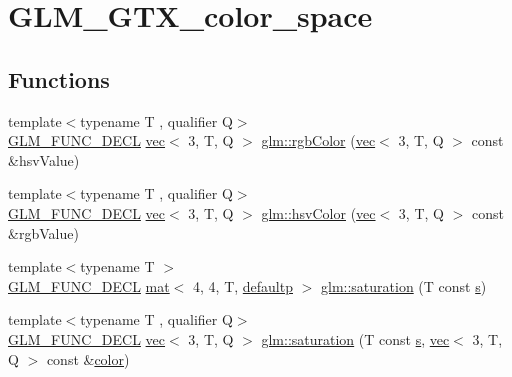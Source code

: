 \hypertarget{group__gtx__color__space}{}\section{G\+L\+M\+\_\+\+G\+T\+X\+\_\+color\+\_\+space}
\label{group__gtx__color__space}
\subsection*{Functions}
\begin{DoxyCompactItemize}
\item 
{\footnotesize template$<$typename T , qualifier Q$>$ }\\\mbox{\hyperlink{setup_8hpp_ab2d052de21a70539923e9bcbf6e83a51}{G\+L\+M\+\_\+\+F\+U\+N\+C\+\_\+\+D\+E\+CL}} \mbox{\hyperlink{structglm_1_1vec}{vec}}$<$ 3, T, Q $>$ \mbox{\hyperlink{group__gtx__color__space_ga5f9193be46f45f0655c05a0cdca006db}{glm\+::rgb\+Color}} (\mbox{\hyperlink{structglm_1_1vec}{vec}}$<$ 3, T, Q $>$ const \&hsv\+Value)
\item 
{\footnotesize template$<$typename T , qualifier Q$>$ }\\\mbox{\hyperlink{setup_8hpp_ab2d052de21a70539923e9bcbf6e83a51}{G\+L\+M\+\_\+\+F\+U\+N\+C\+\_\+\+D\+E\+CL}} \mbox{\hyperlink{structglm_1_1vec}{vec}}$<$ 3, T, Q $>$ \mbox{\hyperlink{group__gtx__color__space_ga789802bec2d4fe0f9741c731b4a8a7d8}{glm\+::hsv\+Color}} (\mbox{\hyperlink{structglm_1_1vec}{vec}}$<$ 3, T, Q $>$ const \&rgb\+Value)
\item 
{\footnotesize template$<$typename T $>$ }\\\mbox{\hyperlink{setup_8hpp_ab2d052de21a70539923e9bcbf6e83a51}{G\+L\+M\+\_\+\+F\+U\+N\+C\+\_\+\+D\+E\+CL}} \mbox{\hyperlink{structglm_1_1mat}{mat}}$<$ 4, 4, T, \mbox{\hyperlink{namespaceglm_a36ed105b07c7746804d7fdc7cc90ff25a9d21ccd8b5a009ec7eb7677befc3bf51}{defaultp}} $>$ \mbox{\hyperlink{group__gtx__color__space_ga01a97152b44e1550edcac60bd849e884}{glm\+::saturation}} (T const \mbox{\hyperlink{_s_d_l__opengl_8h_a4af680a6c683f88ed67b76f207f2e6e4}{s}})
\item 
{\footnotesize template$<$typename T , qualifier Q$>$ }\\\mbox{\hyperlink{setup_8hpp_ab2d052de21a70539923e9bcbf6e83a51}{G\+L\+M\+\_\+\+F\+U\+N\+C\+\_\+\+D\+E\+CL}} \mbox{\hyperlink{structglm_1_1vec}{vec}}$<$ 3, T, Q $>$ \mbox{\hyperlink{group__gtx__color__space_ga2156cea600e90148ece5bc96fd6db43a}{glm\+::saturation}} (T const \mbox{\hyperlink{_s_d_l__opengl_8h_a4af680a6c683f88ed67b76f207f2e6e4}{s}}, \mbox{\hyperlink{structglm_1_1vec}{vec}}$<$ 3, T, Q $>$ const \&\mbox{\hyperlink{_s_d_l__opengl__glext_8h_a3ea846f998d64f079b86052b6c4193a8}{color}})

\end{DoxyCompactItemize}
